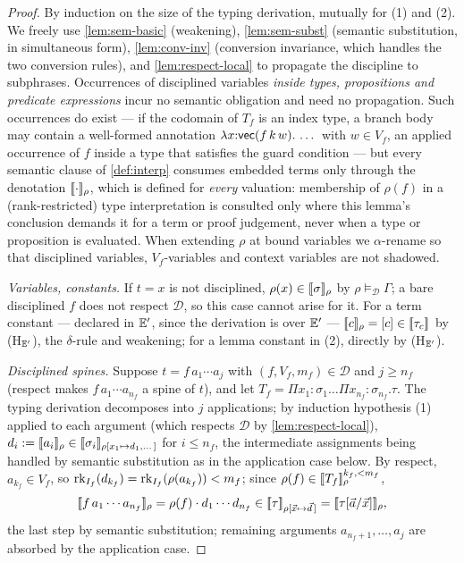 \begin{proof}
By induction on the size of the typing derivation, mutually for (1) and
(2).  We freely use \cref{lem:sem-basic} (weakening),
\cref{lem:sem-subst} (semantic substitution, in simultaneous form),
\cref{lem:conv-inv} (conversion invariance, which handles the two
conversion rules), and \cref{lem:respect-local} to propagate the
discipline to subphrases.  Occurrences of disciplined variables
\emph{inside types, propositions and predicate expressions} incur no
semantic obligation and need no propagation.  Such occurrences do
exist --- if the codomain of $T_f$ is an index type, a branch body may
contain a well-formed annotation $\lambda x{:}\mathsf{vec}(f\,k\,w).\,\dots$
with $w \in V_f$, an applied occurrence of $f$ inside a type that
satisfies the guard condition --- but every semantic clause of
\cref{def:interp} consumes embedded terms only through the denotation
$[\![ \cdot ]\!]_\rho$, which is defined for \emph{every} valuation:
membership of $\rho(f)$ in a (rank-restricted) type interpretation is
consulted only where this lemma's conclusion demands it for a term or
proof judgement, never when a type or proposition is evaluated.  When
extending $\rho$ at bound variables we $\alpha$-rename so that
disciplined variables, $V_f$-variables and context variables are not
shadowed.

\emph{Variables, constants.}  If $t = x$ is not disciplined, $\rho(x)
\in [\![ \sigma ]\!]_{\rho}$ by $\rho \vDash_{\mathcal{D}} \Gamma$; a bare
disciplined $f$ does not respect $\mathcal{D}$, so this case cannot
arise for it.  For a term constant --- declared in $\mathbb{E}'$, since the
derivation is over $\mathbb{E}'$ --- $[\![ c ]\!]_\rho = [c] \in
[\![ \tau_c ]\!]_{}$ by (H$_{\mathbb{E}'}$), the $\delta$-rule and weakening;
for a lemma constant in (2), directly by (H$_{\mathbb{E}'}$).

\emph{Disciplined spines.}  Suppose $t = f\,a_1 \cdots a_j$ with $(f,
V_f, m_f) \in \mathcal{D}$ and $j \geq n_f$ (respect makes $f\,a_1
\cdots a_{n_f}$ a spine of $t$), and let $T_f = \Pi
x_1{:}\sigma_1 \dots \Pi x_{n_f}{:}\sigma_{n_f}.\tau$.  The typing
derivation decomposes into $j$ applications; by induction hypothesis
(1) applied to each argument (which respects $\mathcal{D}$ by
\cref{lem:respect-local}), $d_i \mathrel{:=} [\![ a_i ]\!]_\rho \in
[\![ \sigma_i ]\!]_{\rho[x_1 \mapsto d_1, \dots]}$ for $i \le n_f$, the
intermediate assignments being handled by semantic substitution as in
the application case below.  By respect, $a_{k_f} \in V_f$, so
$\mathrm{rk}_{I_f}(d_{k_f}) = \mathrm{rk}_{I_f}(\rho(a_{k_f})) < m_f$; since
$\rho(f) \in [\![ T_f ]\!]_{\rho}^{k_f, <m_f}$,
\[
  [\![ f\,a_1 \cdots a_{n_f} ]\!]_\rho = \rho(f) \cdot d_1 \cdots d_{n_f}
  \in [\![ \tau ]\!]_{\rho[\vec{x} \mapsto \vec{d}\,]}
  = [\![ \tau[\vec{a}/\vec{x}] ]\!]_{\rho},
\]
the last step by semantic substitution; remaining arguments $a_{n_f+1},
\dots, a_j$ are absorbed by the application case.


\end{proof}
